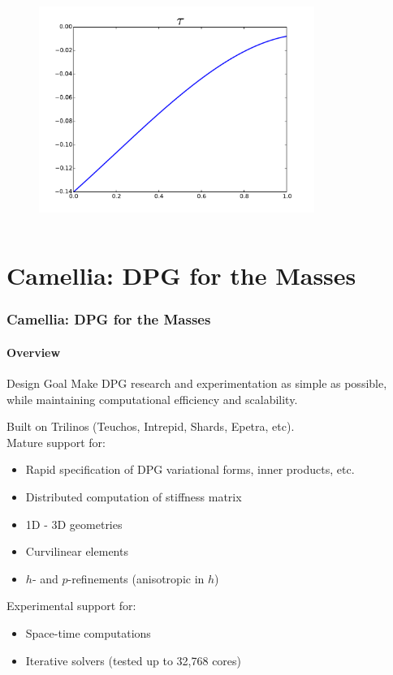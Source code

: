 \documentclass[18pt,xcolor=table]{beamer}
\newcounter{nn}
\begin{document}
\begin{frame}[t]
\begin{columns}
\begin{column}{0.5\textwidth}
\begin{figure}[t]
\includegraphics[width=0.8\textwidth]{OptimalTestFunctions/RobustApprox3_tau}
\end{figure}
\end{column}
\end{columns}
\end{frame}


\section{Camellia: DPG for the Masses}
\begin{frame}[fragile]
\frametitle{Camellia: DPG for the Masses}
\framesubtitle{Overview}  %
\begin{block}{Design Goal}
Make DPG research and experimentation as simple as possible, while maintaining computational efficiency and scalability.
\end{block}
Built on Trilinos (Teuchos, Intrepid, Shards, Epetra, etc).\\
Mature support for:
\begin{itemize}
  \item Rapid specification of DPG variational forms, inner products, etc.
  \item Distributed computation of stiffness matrix
  \item 1D - 3D geometries
  \item Curvilinear elements
  \item $h$- and $p$-refinements (anisotropic in $h$)
\end{itemize}
Experimental support for:
\begin{itemize}
  \item Space-time computations
  \item Iterative solvers (tested up to 32,768 cores)
\end{itemize}
\end{frame}
\end{document}
